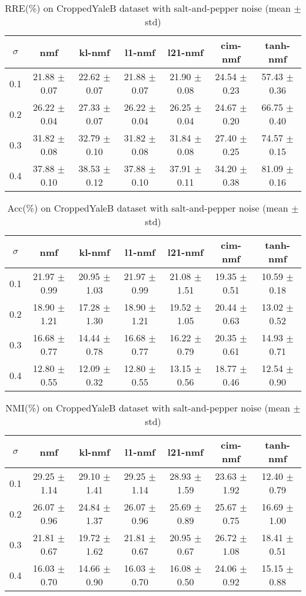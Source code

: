 \documentclass{article} %
\begin{document}
\begin{table}[H]
\begin{tabular}{c|cccccc}$\sigma$ & nmf & kl-nmf & l1-nmf & l21-nmf & cim-nmf & tanh-nmf \\\hline
0.1 & 21.88 $\pm$ 0.07 & 22.62 $\pm$ 0.07 & 21.88 $\pm$ 0.07 & 21.90 $\pm$ 0.08 & 24.54 $\pm$ 0.23 & 57.43 $\pm$ 0.36 \\
0.2 & 26.22 $\pm$ 0.04 & 27.33 $\pm$ 0.07 & 26.22 $\pm$ 0.04 & 26.25 $\pm$ 0.04 & 24.67 $\pm$ 0.20 & 66.75 $\pm$ 0.40 \\
0.3 & 31.82 $\pm$ 0.08 & 32.79 $\pm$ 0.10 & 31.82 $\pm$ 0.08 & 31.84 $\pm$ 0.08 & 27.40 $\pm$ 0.25 & 74.57 $\pm$ 0.15 \\
0.4 & 37.88 $\pm$ 0.10 & 38.53 $\pm$ 0.12 & 37.88 $\pm$ 0.10 & 37.91 $\pm$ 0.11 & 34.20 $\pm$ 0.38 & 81.09 $\pm$ 0.16 \\
\end{tabular}\caption{
  RRE(\%) on CroppedYaleB dataset with salt-and-pepper noise (mean $\pm$ std)
  \label{tab:RRE-CroppedYaleB-salt-and-pepper}
}\end{table}
\begin{table}[H]
\begin{tabular}{c|cccccc}$\sigma$ & nmf & kl-nmf & l1-nmf & l21-nmf & cim-nmf & tanh-nmf \\\hline
0.1 & 21.97 $\pm$ 0.99 & 20.95 $\pm$ 1.03 & 21.97 $\pm$ 0.99 & 21.08 $\pm$ 1.51 & 19.35 $\pm$ 0.51 & 10.59 $\pm$ 0.18 \\
0.2 & 18.90 $\pm$ 1.21 & 17.28 $\pm$ 1.30 & 18.90 $\pm$ 1.21 & 19.52 $\pm$ 1.05 & 20.44 $\pm$ 0.63 & 13.02 $\pm$ 0.52 \\
0.3 & 16.68 $\pm$ 0.77 & 14.44 $\pm$ 0.78 & 16.68 $\pm$ 0.77 & 16.22 $\pm$ 0.79 & 20.35 $\pm$ 0.61 & 14.93 $\pm$ 0.71 \\
0.4 & 12.80 $\pm$ 0.55 & 12.09 $\pm$ 0.32 & 12.80 $\pm$ 0.55 & 13.15 $\pm$ 0.56 & 18.77 $\pm$ 0.46 & 12.54 $\pm$ 0.90 \\
\end{tabular}\caption{
  Acc(\%) on CroppedYaleB dataset with salt-and-pepper noise (mean $\pm$ std)
  \label{tab:Acc-CroppedYaleB-salt-and-pepper}
}\end{table}
\begin{table}[H]
\begin{tabular}{c|cccccc}$\sigma$ & nmf & kl-nmf & l1-nmf & l21-nmf & cim-nmf & tanh-nmf \\\hline
0.1 & 29.25 $\pm$ 1.14 & 29.10 $\pm$ 1.41 & 29.25 $\pm$ 1.14 & 28.93 $\pm$ 1.59 & 23.63 $\pm$ 1.92 & 12.40 $\pm$ 0.79 \\
0.2 & 26.07 $\pm$ 0.96 & 24.84 $\pm$ 1.37 & 26.07 $\pm$ 0.96 & 25.69 $\pm$ 0.89 & 25.67 $\pm$ 0.75 & 16.69 $\pm$ 1.00 \\
0.3 & 21.81 $\pm$ 0.67 & 19.72 $\pm$ 1.62 & 21.81 $\pm$ 0.67 & 20.95 $\pm$ 0.67 & 26.72 $\pm$ 1.08 & 18.41 $\pm$ 0.51 \\
0.4 & 16.03 $\pm$ 0.70 & 14.66 $\pm$ 0.90 & 16.03 $\pm$ 0.70 & 16.08 $\pm$ 0.50 & 24.06 $\pm$ 0.92 & 15.15 $\pm$ 0.88 \\
\end{tabular}\caption{
  NMI(\%) on CroppedYaleB dataset with salt-and-pepper noise (mean $\pm$ std)
  \label{tab:NMI-CroppedYaleB-salt-and-pepper}
}\end{table}
\end{document}
